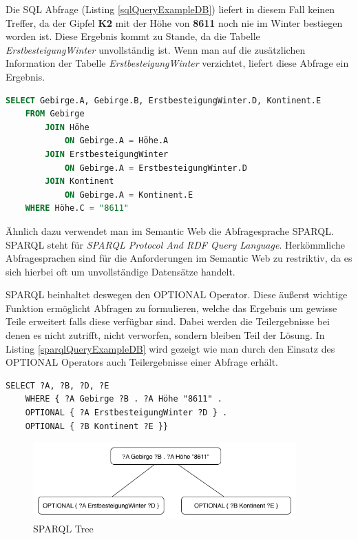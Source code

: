 \documentclass[draft,final]{vutinfth} %
\begin{document}
Die SQL Abfrage (Listing \ref{sqlQueryExampleDB}) liefert in diesem Fall keinen Treffer, da der Gipfel \textbf{K2} mit der Höhe von \textbf{8611} noch nie im Winter bestiegen worden ist. Diese Ergebnis kommt zu Stande, da die Tabelle \textit{ErstbesteigungWinter} unvollständig ist. Wenn man auf die zusätzlichen Information der Tabelle \textit{ErstbesteigungWinter} verzichtet, liefert diese Abfrage ein Ergebnis.

\begin{lstlisting}[language=SQL,caption={SELECT DB Beispiel},frame = single,label={sqlQueryExampleDB}]
SELECT Gebirge.A, Gebirge.B, ErstbesteigungWinter.D, Kontinent.E
	FROM Gebirge 
		JOIN Höhe
			ON Gebirge.A = Höhe.A
		JOIN ErstbesteigungWinter 
			ON Gebirge.A = ErstbesteigungWinter.D
		JOIN Kontinent
			ON Gebirge.A = Kontinent.E
	WHERE Höhe.C = "8611"
\end{lstlisting}
 
Ähnlich dazu verwendet man im Semantic Web die Abfragesprache SPARQL. SPARQL steht für \textit{SPARQL Protocol And RDF Query Language}. Herkömmliche Abfragesprachen sind für die Anforderungen im Semantic Web zu restriktiv, da es sich hierbei oft um unvollständige Datensätze handelt.

SPARQL beinhaltet deswegen den OPTIONAL Operator. Diese äu{\ss}erst wichtige Funktion ermöglicht Abfragen zu formulieren, welche das Ergebnis um gewisse Teile erweitert falls diese verfügbar sind. Dabei werden die Teilergebnisse bei denen es nicht zutrifft, nicht verworfen, sondern bleiben Teil der Lösung. In Listing \ref{sparqlQueryExampleDB} wird gezeigt wie man durch den Einsatz des OPTIONAL Operators auch Teilergebnisse einer Abfrage erhält.

\begin{lstlisting}[language=Sparql,caption={SPARQL DB Beispiel},frame = single,label={sparqlQueryExampleDB}]
SELECT ?A, ?B, ?D, ?E
	WHERE { ?A Gebirge ?B . ?A Höhe "8611" . 
	OPTIONAL { ?A ErstbesteigungWinter ?D } .
	OPTIONAL { ?B Kontinent ?E }}
\end{lstlisting}

\begin{figure}[ht]
	\centering
	\includegraphics[width=0.9\textwidth]{SPARQL}
	\caption{SPARQL Tree}
	\label{sparqlTree}
\end{figure}
\end{document}
